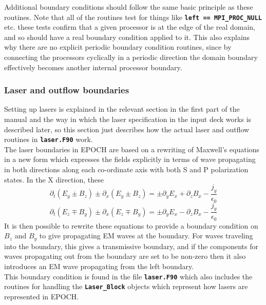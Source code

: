 \documentclass[12pt]{article}
\newcommand{\inlinecode}[1]{{\color{warwickred} \bf\texttt{#1}}}
\newcommand{\nEPOCH}{{\color{warwickdark}\fontfamily{phv}\selectfont EPOCH}}
\newcommand{\EPOCH}{{\nEPOCH} }
\begin{document}
Additional boundary conditions should follow the same basic principle as these
routines. Note that all of the routines test for things like \inlinecode{left
== MPI\_PROC\_NULL} etc. these tests confirm that a given processor is at the
edge of the real domain, and so should have a real boundary condition applied
to it. This also explains why there are no explicit periodic boundary condition
routines, since by connecting the processors cyclically in a periodic direction
the domain boundary effectively becomes another internal processor boundary.

\subsubsection{Laser and outflow boundaries}
Setting up lasers is explained in the relevant section in the first part of the
manual and the way in which the laser specification in the input deck works is
described later, so this section just describes how the actual laser and
outflow routines in \inlinecode{laser.F90} work. \\

The laser boundaries in \EPOCH are based on a rewriting of Maxwell's equations
in a new form which expresses the fields explicitly in terms of wave
propagating in both directions along each co-ordinate axis with both S and P
polarization states. In the X direction, these
\[
\partial_t(E_y \pm B_z) \pm \partial_x(E_y \pm B_z) = \pm \partial_yE_x
+ \partial_zB_x -\frac{j_y}{\epsilon_0}
\]
\[
\partial_t(E_z \mp B_y) \pm \partial_x(E_z \mp B_y) = \pm \partial_yE_x
- \partial_zB_x -\frac{j_y}{\epsilon_0}
\]
It is then possible to rewrite these equations to provide a boundary condition
on $B_z$ and $B_y$ to give propagating EM waves at the boundary. For waves
traveling into the boundary, this gives a transmissive boundary, and if the
components for waves propagating out from the boundary are set to be non-zero
then it also introduces an EM wave propagating from the left boundary.\\

This boundary condition is found in the file \inlinecode{laser.F90} which also
includes the routines for handling the \inlinecode{Laser\_Block} objects which
represent how lasers are represented in \nEPOCH.
\end{document}
